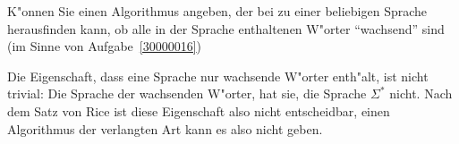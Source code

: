 K"onnen Sie einen Algorithmus angeben, der bei zu einer beliebigen
Sprache herausfinden kann, ob alle in der Sprache enthaltenen W"orter
``wachsend'' sind (im Sinne von Aufgabe~\ref{30000016})

\begin{loesung}
Die Eigenschaft, dass eine Sprache nur wachsende W"orter
enth"alt, ist nicht trivial: Die Sprache der wachsenden
W"orter, hat sie, die Sprache $\Sigma^*$ nicht. Nach dem
Satz von Rice ist diese Eigenschaft also nicht entscheidbar,
einen Algorithmus der verlangten Art kann es also nicht geben.
\end{loesung}
